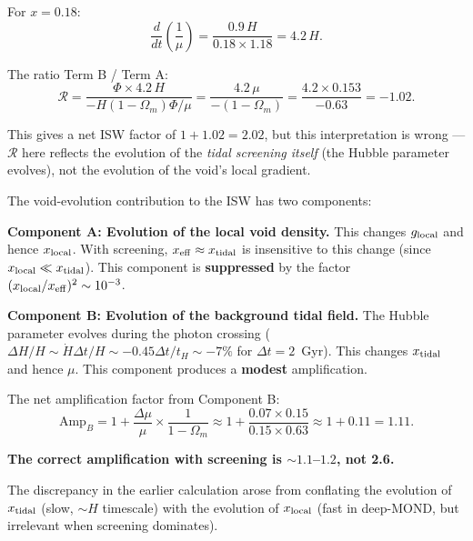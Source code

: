 \documentclass[11pt,a4paper]{article}
\newcounter{findingctr}
\newenvironment{finding}[1][]{%
  \refstepcounter{findingctr}%
  \begin{tcolorbox}[colback=blue!3!white, colframe=blue!50!black,
    title=\textbf{Finding \thefindingctr: #1}]
}{%
  \end{tcolorbox}%
}
\newcommand{\mufd}{\mu}
\newcommand{\Omm}{\Omega_m}
\begin{document}
For $x = 0.18$:
\begin{equation}
\frac{d}{dt}\left(\frac{1}{\mufd}\right)
= \frac{0.9\,H}{0.18\times 1.18} = 4.2\,H.
\end{equation}

The ratio Term B / Term A:
\begin{equation}
\mathcal{R} = \frac{\Phi\times 4.2\,H}
{-H(1-\Omm)\Phi/\mufd}
= \frac{4.2\,\mufd}{-(1-\Omm)}
= \frac{4.2 \times 0.153}{-0.63}
= -1.02.
\end{equation}

This gives a net ISW factor of $1 + 1.02 = 2.02$, but this
interpretation is wrong --- $\mathcal{R}$ here reflects the evolution
of the \emph{tidal screening itself} (the Hubble parameter evolves),
not the evolution of the void's local gradient.

\begin{finding}[Two Distinct Void-Evolution Contributions]
\label{find:two-evolutions}
The void-evolution contribution to the ISW has two components:

\textbf{Component A: Evolution of the local void density.}
This changes $g_{\rm local}$ and hence $x_{\rm local}$. With screening,
$x_{\rm eff} \approx x_{\rm tidal}$ is insensitive to this change
(since $x_{\rm local} \ll x_{\rm tidal}$). This component is
\textbf{suppressed} by the factor $(x_{\rm local}/x_{\rm eff})^2
\sim 10^{-3}$.

\textbf{Component B: Evolution of the background tidal field.}
The Hubble parameter evolves during the photon crossing
($\Delta H/H \sim \dot{H}\Delta t/H \sim -0.45\Delta t/t_H
\sim -7\%$ for $\Delta t = 2$~Gyr). This changes $x_{\rm tidal}$
and hence $\mufd$. This component produces a \textbf{modest}
amplification.

The net amplification factor from Component B:
\begin{equation}
\text{Amp}_B = 1 + \frac{\Delta\mufd}{\mufd}\times\frac{1}{1-\Omm}
\approx 1 + \frac{0.07\times 0.15}{0.15\times 0.63}
\approx 1 + 0.11 = 1.11.
\end{equation}

\textbf{The correct amplification with screening is $\sim 1.1$--$1.2$,
not 2.6.}

The discrepancy in the earlier calculation arose from conflating the
evolution of $x_{\rm tidal}$ (slow, $\sim H$ timescale) with the
evolution of $x_{\rm local}$ (fast in deep-MOND, but irrelevant when
screening dominates).
\end{finding}
\end{document}
